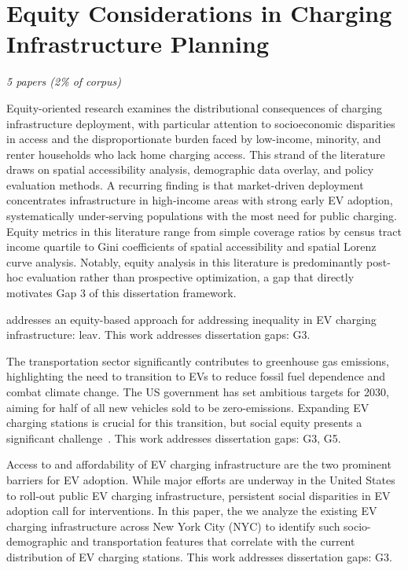 \documentclass[letterpaper, 12pt, oneside, doublespacing]{Thesis}
\begin{document}
\section{Equity Considerations in Charging Infrastructure Planning}

\textit{5 papers (2\% of corpus)}

Equity-oriented research examines the distributional consequences of charging infrastructure deployment, with particular attention to socioeconomic disparities in access and the disproportionate burden faced by low-income, minority, and renter households who lack home charging access. This strand of the literature draws on spatial accessibility analysis, demographic data overlay, and policy evaluation methods. A recurring finding is that market-driven deployment concentrates infrastructure in high-income areas with strong early EV adoption, systematically under-serving populations with the most need for public charging. Equity metrics in this literature range from simple coverage ratios by census tract income quartile to Gini coefficients of spatial accessibility and spatial Lorenz curve analysis. Notably, equity analysis in this literature is predominantly post-hoc evaluation rather than prospective optimization, a gap that directly motivates Gap 3 of this dissertation framework.


\noindent \cite{an_equity-based_2025} addresses an equity-based approach for addressing inequality in EV charging infrastructure: leav. This work addresses dissertation gaps: G3.



\noindent The transportation sector significantly contributes to greenhouse gas emissions, highlighting the need to transition to EVs to reduce fossil fuel dependence and combat climate change. The US government has set ambitious targets for 2030, aiming for half of all new vehicles sold to be zero-emissions. Expanding EV charging stations is crucial for this transition, but social equity presents a significant challenge~\cite{crowdfunding_for_2024}. This work addresses dissertation gaps: G3, G5.



\noindent Access to and affordability of EV charging infrastructure are the two prominent barriers for EV adoption. While major efforts are underway in the United States to roll-out public EV charging infrastructure, persistent social disparities in EV adoption call for interventions. In this paper, the we \cite{inequitable_access_2021} analyze the existing EV charging infrastructure across New York City (NYC) to identify such socio-demographic and transportation features that correlate with the current distribution of EV charging stations. This work addresses dissertation gaps: G3.
\end{document}
